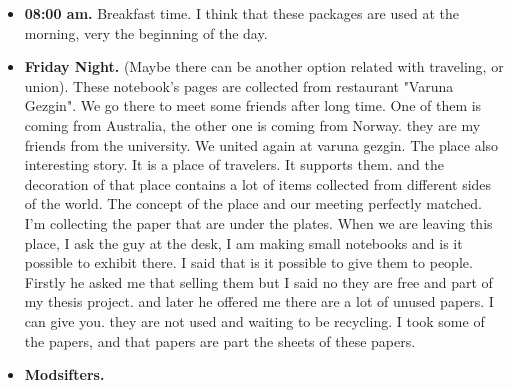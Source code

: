 \begin{itemize}
\item \textbf{08:00 am.} Breakfast time. I think that these packages are used at the morning, very the beginning of the day.
\item \textbf{Friday Night.} (Maybe there can be another option related with traveling, or union). These notebook's pages are collected from restaurant "Varuna Gezgin". We go there to meet some friends after long time. One of them is coming from Australia, the other one is coming from Norway. they are my friends from the university. We united again at varuna gezgin. The place also interesting story. It is a place of travelers. It supports them. and the decoration of that place contains a lot of items collected from different sides of the world. The concept of the place and our meeting perfectly matched. I'm collecting the paper that are under the plates. When we are leaving this place, I ask the guy at the desk, I am making small notebooks and is it possible to exhibit there. I said that is it possible to give them to people. Firstly he asked me that selling them but I said no they are free and part of my thesis project. and later he offered me there are a lot of unused papers. I can give you. they are not used and waiting to be recycling. I took some of the papers, and that papers are part the sheets of these papers. 
\item \textbf{Modsifters.} 


\end{itemize}

